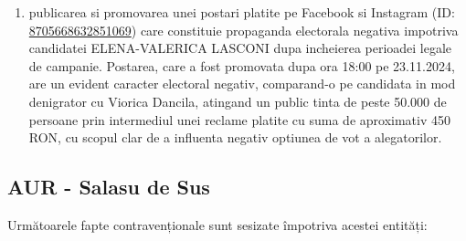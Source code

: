 \documentclass[a4paper,12pt]{article}
\begin{document}
\begin{enumerate}[leftmargin=*, label=\arabic*.)]
    \item publicarea si promovarea unei postari platite pe Facebook si Instagram (ID: \href{https://www.facebook.com/ads/library/?id=8705668632851069}{8705668632851069}) care constituie propaganda electorala negativa impotriva candidatei ELENA-VALERICA LASCONI dupa incheierea perioadei legale de campanie. Postarea, care a fost promovata dupa ora 18:00 pe 23.11.2024, are un evident caracter electoral negativ, comparand-o pe candidata in mod denigrator cu Viorica Dancila, atingand un public tinta de peste 50.000 de persoane prin intermediul unei reclame platite cu suma de aproximativ 450 RON, cu scopul clar de a influenta negativ optiunea de vot a alegatorilor.
\end{enumerate}

\vspace{0.5cm}

\subsection{AUR - Salasu de Sus}
Următoarele fapte contravenționale sunt sesizate împotriva acestei entități:
\end{document}
